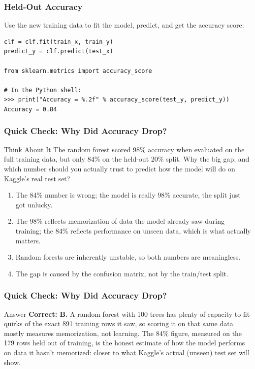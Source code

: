 \begin{frame}[fragile]\frametitle{Held-Out Accuracy}
Use the new training data to fit the model, predict, and get the accuracy score:
\begin{lstlisting}
clf = clf.fit(train_x, train_y)
predict_y = clf.predict(test_x)

from sklearn.metrics import accuracy_score

# In the Python shell:
>>> print("Accuracy = %.2f" % accuracy_score(test_y, predict_y))
Accuracy = 0.84
\end{lstlisting}
\end{frame}

\begin{frame}[fragile]\frametitle{Quick Check: Why Did Accuracy Drop?}
\begin{block}{Think About It}
The random forest scored 98\% accuracy when evaluated on the full training data, but only
84\% on the held-out 20\% split. Why the big gap, and which number should you actually
trust to predict how the model will do on Kaggle's real test set?
\begin{enumerate}
  \item[A.] The 84\% number is wrong; the model is really 98\% accurate, the split just got
  unlucky.
  \item[B.] The 98\% reflects memorization of data the model already saw during training; the
  84\% reflects performance on unseen data, which is what actually matters.
  \item[C.] Random forests are inherently unstable, so both numbers are meaningless.
  \item[D.] The gap is caused by the confusion matrix, not by the train/test split.
\end{enumerate}
\end{block}
\end{frame}

\begin{frame}[fragile]\frametitle{Quick Check: Why Did Accuracy Drop?}
\begin{block}{Answer}
\textbf{Correct: B.} A random forest with 100 trees has plenty of capacity to fit quirks of
the exact 891 training rows it saw, so scoring it on that same data mostly measures
memorization, not learning. The 84\% figure, measured on the 179 rows held out of training,
is the honest estimate of how the model performs on data it hasn't memorized: closer to what
Kaggle's actual (unseen) test set will show.
\end{block}
\end{frame}



